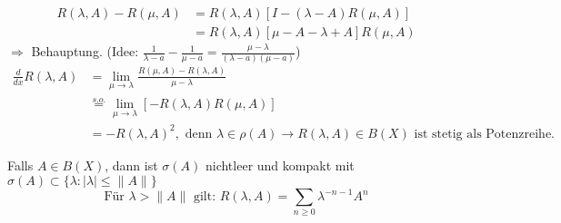 \begin{beweis}
	\begin{align*}
		R( \lambda, A) - R( \mu, A) & = R( \lambda, A) \left[ I - (\lambda - A) R(\mu, A) \right]	\\
			& = R( \lambda, A) \left[ \mu - A - \lambda + A \right] R(\mu, A)
	\end{align*}
	$\Rightarrow$ Behauptung. (Idee: $\frac{1}{\lambda - a} - \frac{1}{\mu - a} = \frac{\mu - \lambda}{(\lambda - a)(\mu - a)}$)
	\begin{align*}
		\frac{d}{dx} R(\lambda, A) & = \lim_{\mu \rightarrow \lambda} \frac{R(\mu, A) - R(\lambda, A)}{\mu - \lambda} \\
				& \overset{s.o.}{=} \lim_{\mu \rightarrow \lambda} \left[ - R( \lambda, A) R(\mu, A) \right] \\
				& = - R(\lambda, A)^{2}, \text{ denn } \lambda \in \rho(A) \rightarrow R(\lambda, A) \in B(X) \text{ ist stetig als Potenzreihe.} 		
	\end{align*}
\end{beweis}


\begin{satz}
	Falls $A \in B(X)$, dann ist $\sigma(A)$ nichtleer und kompakt mit $\sigma(A) \subset \{ \lambda : |\lambda| \leq \| A \| \}$ \\
	\[ \text{Für } \lambda > \| A \| \text{ gilt: } R(\lambda, A) = \sum_{n \geq 0} \lambda^{-n-1} A^{n} \]
\end{satz}

